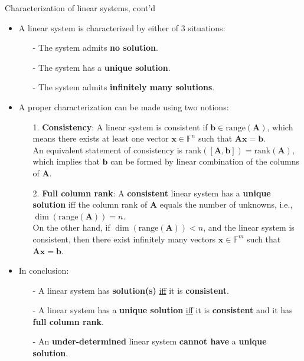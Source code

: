 \documentclass[t,usepdftitle=false]{beamer}
\begin{document}
\begin{frame}{Characterization of linear systems, cont'd}
\begin{itemize}
\item A linear system is characterized by either of 3 situations:
\begin{itemize}
\item[-] The system admits \textbf{no solution}.
\item[-] The system has a \textbf{unique solution}.
\item[-] The system admits \textbf{infinitely many solutions}.
\end{itemize}
\item A proper characterization can be made using two notions:
\begin{enumerate}
\item[1.] \textbf{Consistency}: A linear system is consistent if $\mathbf{b}\in\mathrm{range}(\mathbf{A})$, which means there exists at least one vector $\mathbf{x}\in\mathbb{F}^n$ such that $\mathbf{A}\mathbf{x}=\mathbf{b}$.\tinyskip\\
An equivalent statement of consistency is $\mathrm{rank}([\mathbf{A},\mathbf{b}])=\mathrm{rank}(\mathbf{A})$, which implies that $\mathbf{b}$ can be formed by linear combination of the columns of $\mathbf{A}$.\tinyskip
\item[2.]  \textbf{Full column rank}: A \textbf{consistent} linear system has a \textbf{unique solution} iff the column rank of $\mathbf{A}$ equals the number of unknowns, i.e., $\dim(\mathrm{range}(\mathbf{A}))=n$.\tinyskip\\
On the other hand, if $\dim(\mathrm{range}(\mathbf{A}))<n$, and the linear system is consistent, then there exist infinitely many vectors $\mathbf{x}\in\mathbb{F}^m$ such that $\mathbf{A}\mathbf{x}=\mathbf{b}$.
\end{enumerate}
\item In conclusion:
\begin{itemize}
\item[-] A linear system has \textbf{solution(s)} \underline{iff} it is \textbf{consistent}.
\item[-] A linear system has a \textbf{unique solution} \underline{iff} it is \textbf{consistent} and it has \textbf{full column rank}.
\item[-] An \textbf{under-determined} linear system \textbf{cannot have} a \textbf{unique solution}.%
\end{itemize}
\end{itemize}
\end{frame}
\end{document}
